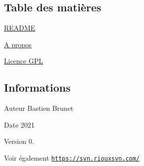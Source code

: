 \hypertarget{index_section_tdm}{}\subsection{Table des matières}\label{index_section_tdm}

\begin{DoxyItemize}
\item \hyperlink{page__r_e_a_d_m_e}{R\+E\+A\+D\+ME}
\item \hyperlink{page_about}{A propos}
\item \hyperlink{page_licence}{Licence G\+PL}
\end{DoxyItemize}\hypertarget{index_section_infos}{}\subsection{Informations}\label{index_section_infos}
\begin{DoxyAuthor}{Auteur}
Bastien Brunet 
\end{DoxyAuthor}
\begin{DoxyDate}{Date}
2021 
\end{DoxyDate}
\begin{DoxyVersion}{Version}
0. 
\end{DoxyVersion}
\begin{DoxySeeAlso}{Voir également}
\href{https://svn.riouxsvn.com/}{\tt https\+://svn.\+riouxsvn.\+com/} 
\end{DoxySeeAlso}
